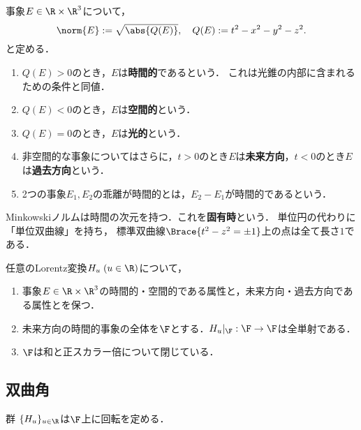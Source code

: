 \documentclass[uplatex,dvipdfmx]{jsreport}
\begin{document}
\begin{definition}
    事象$E\in\R\times\R^3$について，
    \[\norm{E}:=\sqrt{\abs{Q(E)}},\quad Q(E):=t^2-x^2-y^2-z^2.\]
    と定める．
    \begin{enumerate}
        \item $Q(E)>0$のとき，$E$は\textbf{時間的}であるという．
        これは光錐の内部に含まれるための条件と同値．
        \item $Q(E)<0$のとき，$E$は\textbf{空間的}という．
        \item $Q(E)=0$のとき，$E$は\textbf{光的}という．
        \item 非空間的な事象についてはさらに，$t>0$のとき$E$は\textbf{未来方向}，$t<0$のとき$E$は\textbf{過去方向}という．
        \item 2つの事象$E_1,E_2$の乖離が時間的とは，$E_2-E_1$が時間的であるという．
    \end{enumerate}
\end{definition}
\begin{remarks}[Minkowskiノルムと固有時]
    Minkowskiノルムは時間の次元を持つ．これを\textbf{固有時}という．
    単位円の代わりに「単位双曲線」を持ち，
    標準双曲線$\Brace{t^2-z^2=\pm1}$上の点は全て長さ$1$である．
\end{remarks}

\begin{theorem}
    任意のLorentz変換$H_u\;(u\in\R)$について，
    \begin{enumerate}
        \item 事象$E\in\R\times\R^3$の時間的・空間的である属性と，未来方向・過去方向である属性とを保つ．
        \item 未来方向の時間的事象の全体を$\F$とする．$H_u|_\F:\F\to\F$は全単射である．
        \item $\F$は和と正スカラー倍について閉じている．
    \end{enumerate}
\end{theorem}

\subsection{双曲角}

\begin{tcolorbox}[colframe=ForestGreen, colback=ForestGreen!10!white,breakable,colbacktitle=ForestGreen!40!white,coltitle=black,fonttitle=\bfseries\sffamily,
title=]
    群
    $\{H_u\}_{u\in\R}$は$\F$上に回転を定める．
\end{tcolorbox}
\end{document}
